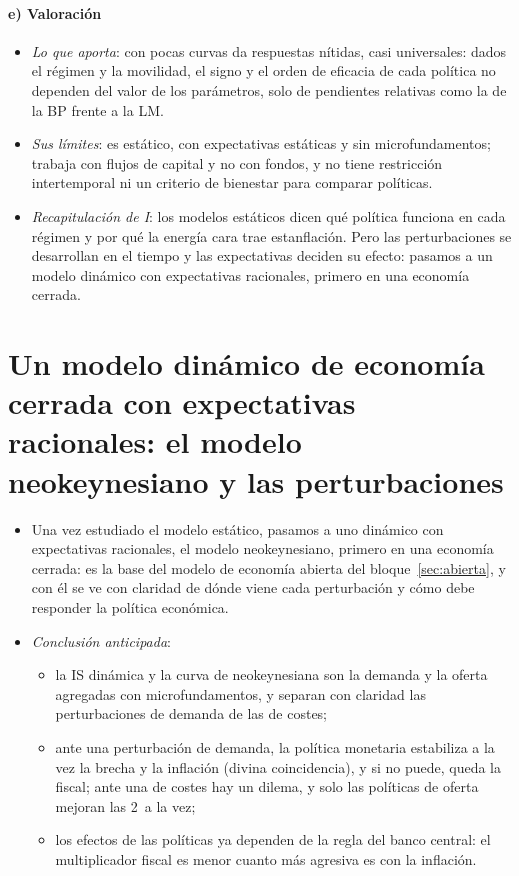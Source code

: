 \documentclass[11pt]{article}
\begin{document}
\paragraph{e) Valoración}

\begin{itemize}
\item \emph{Lo que aporta}: con pocas curvas da respuestas nítidas, casi universales: dados el régimen y la movilidad, el signo y el orden de eficacia de cada política no dependen del valor de los parámetros, solo de pendientes relativas como la de la BP frente a la LM.
\item \emph{Sus límites}: es estático, con expectativas estáticas y sin microfundamentos; trabaja con flujos de capital y no con fondos, y no tiene restricción intertemporal ni un criterio de bienestar para comparar políticas\nocite{ObstfeldRogoff1995Redux}.
\item \emph{Recapitulación de I}: los modelos estáticos dicen qué política funciona en cada régimen y por qué la energía cara trae estanflación. Pero las perturbaciones se desarrollan en el tiempo y las expectativas deciden su efecto: pasamos a un modelo dinámico con expectativas racionales, primero en una economía cerrada.
\end{itemize}


\section{Un modelo dinámico de economía cerrada con expectativas racionales:\cortetitulo{} el modelo neokeynesiano y las perturbaciones}\label{sec:nek}

\begin{itemize}
\item Una vez estudiado el modelo estático, pasamos a uno dinámico con expectativas racionales, el modelo neokeynesiano, primero en una economía cerrada: es la base del modelo de economía abierta del bloque~\ref{sec:abierta}, y con él se ve con claridad de dónde viene cada perturbación y cómo debe responder la política económica.
\item \emph{Conclusión anticipada}:
  \begin{itemize}
  \item la IS dinámica y la curva de  neokeynesiana son la demanda y la oferta agregadas con microfundamentos, y separan con claridad las perturbaciones de demanda de las de costes;
  \item ante una perturbación de demanda, la política monetaria estabiliza a la vez la brecha y la inflación (divina coincidencia), y si no puede, queda la fiscal; ante una de costes hay un dilema, y solo las políticas de oferta mejoran las 2~a la vez;
  \item los efectos de las políticas ya dependen de la regla del banco central: el multiplicador fiscal es menor cuanto más agresiva es con la inflación.
  \end{itemize}
\end{itemize}
\end{document}
